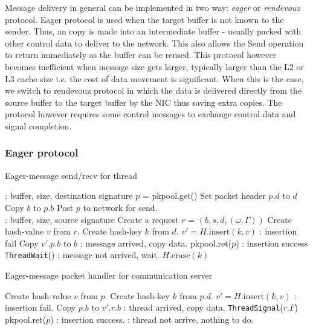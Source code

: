 \documentclass{sig-alternate-05-2015}
\begin{document}
Message delivery in general can be implemented in two way: \textit{eager} or \textit{rendevouz}
protocol. Eager protocol is used when the target buffer is not known to the
sender. Thus, an copy is made into an intermediate buffer - usually packed with
other control data to deliver to the network. This also allows the Send
operation to return immediately as the buffer can be reused.  This protocol
however becomes inefficient when message size gets larger, typically larger
than the L2 or L3 cache size i.e. the cost of data movement is significant.
When this is the case, we switch to rendevouz protocol in which the data is
delivered directly from the source buffer to the target buffer by the NIC thus
saving extra copies.  The protocol however requires some control messages to
exchange control data and signal completion.

\subsubsection{Eager protocol}

\begin{algorithm}
  \caption{Eager-message send/recv for thread}
  \label{algo:short}
  \begin{algorithmic}[1] %
     \Comment: buffer, size, destination signature 
      \State $p$ = pkpool.get()
      \State Set packet header $p.d$ to $d$
      \State Copy $b$ to $p.b$
      \State Post $p$ to network for send.
    \EndProcedure
    \\
     \Comment: buffer, size, source signature 
      \State Create a request $r$ = $(b,s,d, (\omega, \Gamma))$
      \State Create hash-value $v$ from $r$.
      \State Create hash-key $k$ from $d$.
      \State $v' = H.\text{insert}(k,v)$
        \Comment: insertion fail
        \State Copy $v'.p.b$ to $b$
        \Comment: message arrived, copy data.
        \State pkpool.ret($p$)
      \Else
        \Comment: insertion success
        \State \texttt{ThreadWait}()
        \Comment: message not arrived, wait.
      \EndIf
      \State $H.\text{erase}(k)$
    \EndProcedure
  \end{algorithmic}
\end{algorithm}

\begin{algorithm}
  \caption{Eager-message packet handler for communication server}
  \label{algo:server-short}
  \begin{algorithmic}[1]
      \State Create hash-value $v$ from $p$.
      \State Create hash-key $k$ from $p.d$.
      \State $v' = H.\text{insert}(k,v)$
        \Comment: insertion fail.
        \State Copy $p.b$ to $v'.r.b$
        \Comment: thread arrived, copy data.
        \State \texttt{ThreadSignal}($r.\Gamma$)
        \State pkpool.ret($p$)
      \Else
        \Comment: insertion success.
        \State \Return
        \Comment: thread not arrive, nothing to do.
      \EndIf
    \EndProcedure
  \end{algorithmic}
\end{algorithm}
\end{document}
